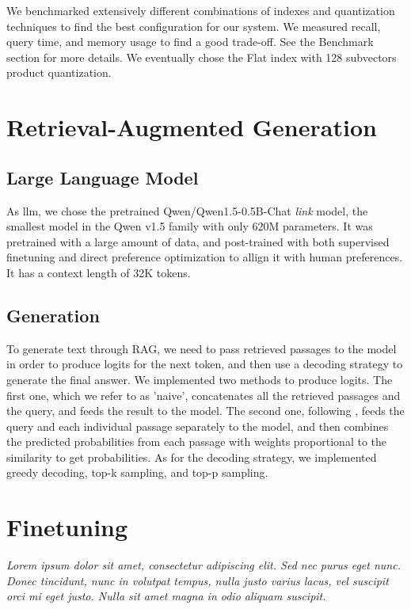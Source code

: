 \documentclass[11pt]{article}
\begin{document}
We benchmarked extensively different combinations of indexes and quantization techniques to find the best configuration
for our system. We measured recall, query time, and memory usage to find a good trade-off. See the Benchmark section for more details.
We eventually chose the Flat index with 128 subvectors product quantization.

\section{Retrieval-Augmented Generation}

\subsection{Large Language Model}

As llm, we chose the pretrained Qwen/Qwen1.5-0.5B-Chat \textit{link} model, the smallest model in the Qwen v1.5 family
with only 620M parameters. It was pretrained with a large amount of data, and post-trained with both supervised finetuning 
and direct preference optimization to allign it with human preferences. It has a context length of 32K tokens.

\subsection{Generation}

To generate text through RAG, we need to pass retrieved passages to the model in order to produce logits
for the next token, and then use a decoding strategy to generate the final answer.
We implemented two methods to produce logits. The first one, which we refer to as 'naive', concatenates all the retrieved passages
and the query, and feeds the result to the model. The second one, following \cite{replug}, feeds the query and each individual passage
separately to the model, and then combines the predicted probabilities from each passage with weights proportional to the similarity
to get probabilities.
As for the decoding strategy, we implemented greedy decoding, top-k sampling, and top-p sampling. \cite{smth}

\section{Finetuning}

\textit{Lorem ipsum dolor sit amet, consectetur adipiscing elit. Sed nec purus eget
nunc. Donec tincidunt, nunc in volutpat tempus, nulla justo varius lacus, vel
suscipit orci mi eget justo. Nulla sit amet magna in odio aliquam suscipit.}
\end{document}
